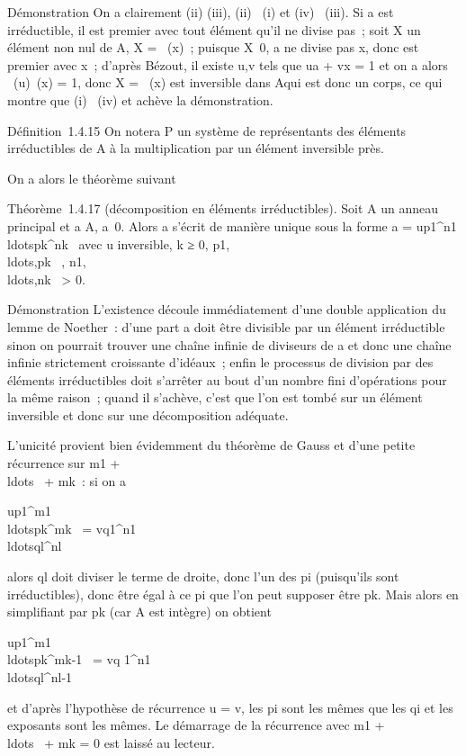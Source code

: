Démonstration On a clairement (ii) \Leftrightarrow (iii),
(ii) \rigtharrow~(i) et (iv) \rigtharrow~(iii). Si a est irréductible, il est premier avec
tout élément qu'il ne divise pas~; soit X un élément non nul de A\diagupaA, X
= \pi~(x)~; puisque X\neq~0, a ne divise pas x, donc
est premier avec x~; d'après Bézout, il existe u,v tels que ua + vx = 1
et on a alors \pi~(u)\pi~(x) = 1, donc X = \pi~(x) est inversible dans A\diagupaA qui
est donc un corps, ce qui montre que (i) \rigtharrow~(iv) et achève la
démonstration.

Définition~1.4.15 On notera P un système de représentants des éléments
irréductibles de A à la multiplication par un élément inversible près.

On a alors le théorème suivant

Théorème~1.4.17 (décomposition en éléments irréductibles). Soit A un
anneau principal et a \in A, a\neq~0. Alors a
s'écrit de manière unique sous la forme a =
up1^n1\\ldotspk^nk~
avec u inversible, k ≥ 0,
p1,\\ldots,pk~
\inP,
n1,\\ldots,nk~
\textgreater{} 0.

Démonstration L'existence découle immédiatement d'une double application
du lemme de Noether~: d'une part a doit être divisible par un élément
irréductible sinon on pourrait trouver une chaîne infinie de diviseurs
de a et donc une chaîne infinie strictement croissante d'idéaux~; enfin
le processus de division par des éléments irréductibles doit s'arrêter
au bout d'un nombre fini d'opérations pour la même raison~; quand il
s'achève, c'est que l'on est tombé sur un élément inversible et donc sur
une décomposition adéquate.

L'unicité provient bien évidemment du théorème de Gauss et d'une petite
récurrence sur m1 +
\\ldots~ +
mk~: si on a

up1^m1
\\ldotspk^mk~
 = vq1^n1
\\ldotsql^nl~


alors ql doit diviser le terme de droite, donc l'un des
pi (puisqu'ils sont irréductibles), donc être égal à ce
pi que l'on peut supposer être pk. Mais alors en
simplifiant par pk (car A est intègre) on obtient

up1^m1
\\ldotspk^mk-1~
= vq 1^n1
\\ldotsql^nl-1~

et d'après l'hypothèse de récurrence u = v, les pi sont les
mêmes que les qi et les exposants sont les mêmes. Le démarrage
de la récurrence avec m1 +
\\ldots~ +
mk = 0 est laissé au lecteur.

